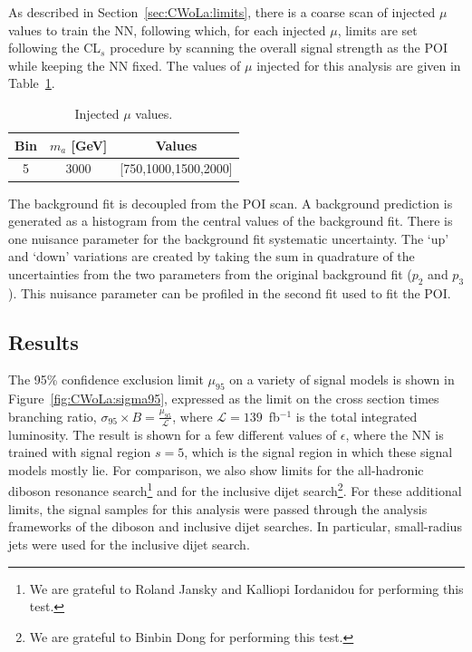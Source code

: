 As described in Section~\ref{sec:CWoLa:limits}, there is a coarse scan of injected $\mu$ values to train the NN, following which, for each injected $\mu$, limits are set following the CL$_s$ procedure by scanning the overall signal strength as the POI while keeping the NN fixed.
The values of $\mu$ injected for this analysis are given in Table~\ref{tab:MC:injectedmu}.

\begin{table}[htb]
  \centering
  \caption{Injected $\mu$ values.}
  \label{tab:MC:injectedmu}
  \begin{tabular}{c c c}
    \hline
    Bin & $m_a$ [GeV] & Values \\ \hline
    5 & 3000 & [750,1000,1500,2000] \\
    \hline
  \end{tabular}
\end{table} 

The background fit is decoupled from the POI scan.  A background prediction is generated as a histogram from the central values of the background fit.  There is one nuisance parameter for the background fit systematic uncertainty.  The `up' and `down' variations are created by taking the sum in quadrature of the uncertainties from the two parameters from the original background fit ($p_2$ and $p_3$).  This nuisance parameter can be profiled in the second fit used to fit the POI.   

\subsection{Results}


The 95\% confidence exclusion limit $\mu_{95}$ on a variety of signal models is shown in Figure~\ref{fig:CWoLa:sigma95}, expressed as the limit on the cross section times branching ratio, $\sigma_{95}\times B = \frac{\mu_{95}}{\mathcal{L}}$, where $\mathcal{L} = 139$~fb$^{-1}$ is the total integrated luminosity.
The result is shown for a few different values of $\epsilon$, where the NN is trained with signal region $s=5$, which is the signal region in which these signal models mostly lie.
For comparison, we also show limits for the all-hadronic diboson resonance search\footnote{We are grateful to Roland Jansky and Kalliopi Iordanidou for performing this test.} and for the inclusive dijet search\footnote{We are grateful to Binbin Dong for performing this test.}.
For these additional limits, the signal samples for this analysis were passed through the analysis frameworks of the diboson and inclusive dijet searches.
In particular, small-radius jets were used for the inclusive dijet search.

